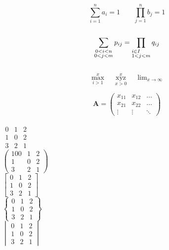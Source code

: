 \documentclass[]{ctexart}
\begin{document}
	
	
	\[
		\sum_{i=1}^{n} a_i = 1 \qquad	\prod_{j=1}^{n} b_j = 1
	\] \\
	
	\[
		\sum_{\substack{0<i<n \\ 0<j<m}} p_{ij} = \prod_{\begin{subarray} {l}i \in I \\ 1<j<m\end{subarray} } q_{ij}
	\] \\
	
	\[
		\max\limits_{i>1}^{x} \quad \mathop{xyz}\limits_{x>0}^{x} \quad \lim\nolimits_{x\to\infty}
	\]
	
	
	\[
		\mathbf{A} =
		\left(
			\begin{array}{ccc}
				x_{11} & x_{12} & \ldots \\
				x_{21} & x_{22} & \ldots \\
				\vdots & \vdots & \ddots
			\end{array}
			\right
		)
	\] \\
	
	\centering $\begin{matrix} 0 & 1 & 2 \\ 1 & 0 & 2 \\ 3 & 2 & 1\end{matrix} 	$ \\
	
	\centering $\begin{pmatrix} 100 & 1 & 2 \\ 1 & 0 & 2 \\ 3 & 2 & 1\end{pmatrix} 	$ \\
	
	\centering $\begin{bmatrix} 0 & 1 & 2 \\ 1 & 0 & 2 \\ 3 & 2 & 1\end{bmatrix} 	$ \\
	
	\centering $\begin{Bmatrix} 0 & 1 & 2 \\ 1 & 0 & 2 \\ 3 & 2 & 1\end{Bmatrix} 	$ \\
	
	\centering $\begin{vmatrix} 0 & 1 & 2 \\ 1 & 0 & 2 \\ 3 & 2 & 1\end{vmatrix} 	$ \\
	
\end{document}

